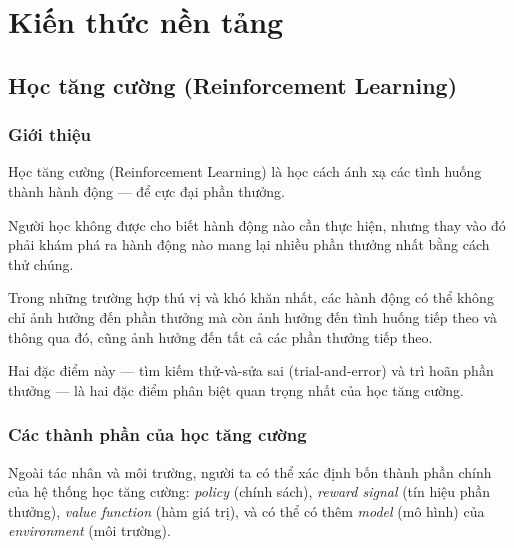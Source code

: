 \chapter{Kiến thức nền tảng}

\section{Học tăng cường (Reinforcement Learning)}

\subsection{Giới thiệu}
Học tăng cường (Reinforcement Learning) \cite{reinforcementlearninganintroduction}
là học cách ánh xạ các tình huống thành hành động — để cực đại phần thưởng.

Người học không được cho biết hành động nào cần thực hiện, nhưng thay vào đó
phải khám phá ra hành động nào mang lại nhiều phần thưởng nhất bằng cách
thử chúng.

Trong những trường hợp thú vị và khó khăn nhất, các hành động có thể
không chỉ ảnh hưởng đến phần thưởng mà còn ảnh hưởng đến tình huống
tiếp theo và thông qua đó, cũng ảnh hưởng đến tất cả các phần thưởng
tiếp theo.

Hai đặc điểm này — tìm kiếm thử-và-sửa sai (trial-and-error) và
trì hoãn phần thưởng — là hai đặc điểm phân biệt quan trọng nhất
của học tăng cường.

\subsection{Các thành phần của học tăng cường}
Ngoài tác nhân và môi trường, người ta có thể xác định bốn thành phần chính
của hệ thống học tăng cường: \textit{policy} (chính sách),
\textit{reward signal} (tín hiệu phần thưởng),
\textit{value function} (hàm giá trị), và có thể có thêm
\textit{model} (mô hình) của \textit{environment} (môi trường).

